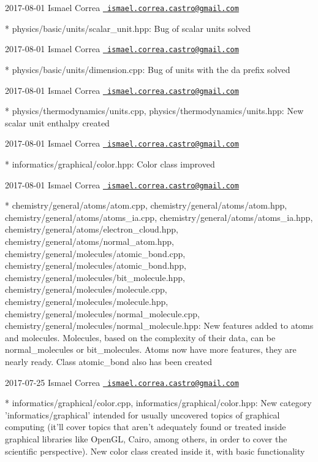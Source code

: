  2017-\/08-\/01 Ismael Correa \href{mailto:ismael.correa.castro@gmail.com}{\texttt{ ismael.\+correa.\+castro@gmail.\+com}} \begin{DoxyVerb}* physics/basic/units/scalar_unit.hpp: Bug of scalar units solved
\end{DoxyVerb}
 2017-\/08-\/01 Ismael Correa \href{mailto:ismael.correa.castro@gmail.com}{\texttt{ ismael.\+correa.\+castro@gmail.\+com}} \begin{DoxyVerb}* physics/basic/units/dimension.cpp: Bug of units with the da prefix
solved
\end{DoxyVerb}
 2017-\/08-\/01 Ismael Correa \href{mailto:ismael.correa.castro@gmail.com}{\texttt{ ismael.\+correa.\+castro@gmail.\+com}} \begin{DoxyVerb}* physics/thermodynamics/units.cpp,
physics/thermodynamics/units.hpp: New scalar unit enthalpy created
\end{DoxyVerb}
 2017-\/08-\/01 Ismael Correa \href{mailto:ismael.correa.castro@gmail.com}{\texttt{ ismael.\+correa.\+castro@gmail.\+com}} \begin{DoxyVerb}* informatics/graphical/color.hpp: Color class improved
\end{DoxyVerb}
 2017-\/08-\/01 Ismael Correa \href{mailto:ismael.correa.castro@gmail.com}{\texttt{ ismael.\+correa.\+castro@gmail.\+com}} \begin{DoxyVerb}* chemistry/general/atoms/atom.cpp,
chemistry/general/atoms/atom.hpp,
chemistry/general/atoms/atoms_ia.cpp,
chemistry/general/atoms/atoms_ia.hpp,
chemistry/general/atoms/electron_cloud.hpp,
chemistry/general/atoms/normal_atom.hpp,
chemistry/general/molecules/atomic_bond.cpp,
chemistry/general/molecules/atomic_bond.hpp,
chemistry/general/molecules/bit_molecule.hpp,
chemistry/general/molecules/molecule.cpp,
chemistry/general/molecules/molecule.hpp,
chemistry/general/molecules/normal_molecule.cpp,
chemistry/general/molecules/normal_molecule.hpp: New features added
to atoms and molecules. Molecules, based on the complexity of their
data, can be normal_molecules or bit_molecules. Atoms now have more
features, they are nearly ready. Class atomic_bond also has been
created
\end{DoxyVerb}
 2017-\/07-\/25 Ismael Correa \href{mailto:ismael.correa.castro@gmail.com}{\texttt{ ismael.\+correa.\+castro@gmail.\+com}} \begin{DoxyVerb}* informatics/graphical/color.cpp, informatics/graphical/color.hpp: 
New category 'informatics/graphical' intended for usually uncovered
topics of graphical computing (it'll cover topics that aren't
adequately found or treated inside graphical libraries like OpenGL,
Cairo, among others, in order to cover the scientific perspective).
New color class created inside it, with basic functionality
\end{DoxyVerb}
